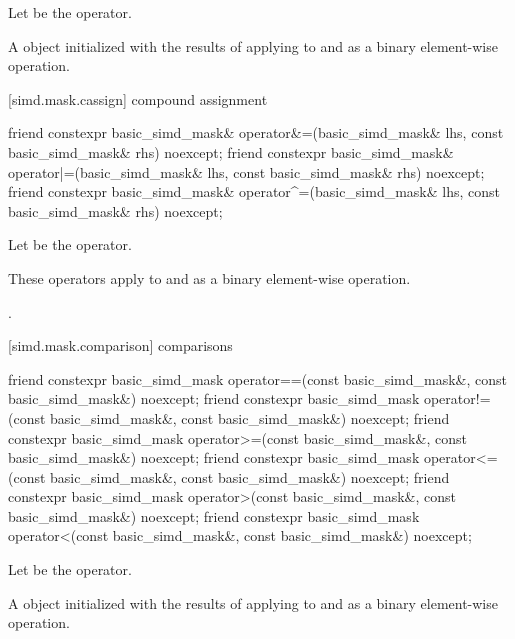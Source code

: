 \begin{itemdescr}
  \pnum Let \op{} be the operator.

  \pnum\returns
  A  object initialized with the results of applying \op{}
  to  and  as a binary element-wise operation.
\end{itemdescr}

[simd.mask.cassign]{ compound assignment}

\begin{itemdecl}
friend constexpr basic_simd_mask&
  operator&=(basic_simd_mask& lhs, const basic_simd_mask& rhs) noexcept;
friend constexpr basic_simd_mask&
  operator|=(basic_simd_mask& lhs, const basic_simd_mask& rhs) noexcept;
friend constexpr basic_simd_mask&
  operator^=(basic_simd_mask& lhs, const basic_simd_mask& rhs) noexcept;
\end{itemdecl}

\begin{itemdescr}
  \pnum Let \op{} be the operator.

  \pnum\effects
  These operators apply \op{} to  and  as a binary
  element-wise operation.

  \pnum\returns
  .
\end{itemdescr}

[simd.mask.comparison]{ comparisons}

\begin{itemdecl}
friend constexpr basic_simd_mask
  operator==(const basic_simd_mask&, const basic_simd_mask&) noexcept;
friend constexpr basic_simd_mask
  operator!=(const basic_simd_mask&, const basic_simd_mask&) noexcept;
friend constexpr basic_simd_mask
  operator>=(const basic_simd_mask&, const basic_simd_mask&) noexcept;
friend constexpr basic_simd_mask
  operator<=(const basic_simd_mask&, const basic_simd_mask&) noexcept;
friend constexpr basic_simd_mask
  operator>(const basic_simd_mask&, const basic_simd_mask&) noexcept;
friend constexpr basic_simd_mask
  operator<(const basic_simd_mask&, const basic_simd_mask&) noexcept;
\end{itemdecl}

\begin{itemdescr}
  \pnum Let \op{} be the operator.

  \pnum\returns
  A  object initialized with the results of applying \op{}
  to  and  as a binary element-wise operation.
\end{itemdescr}

